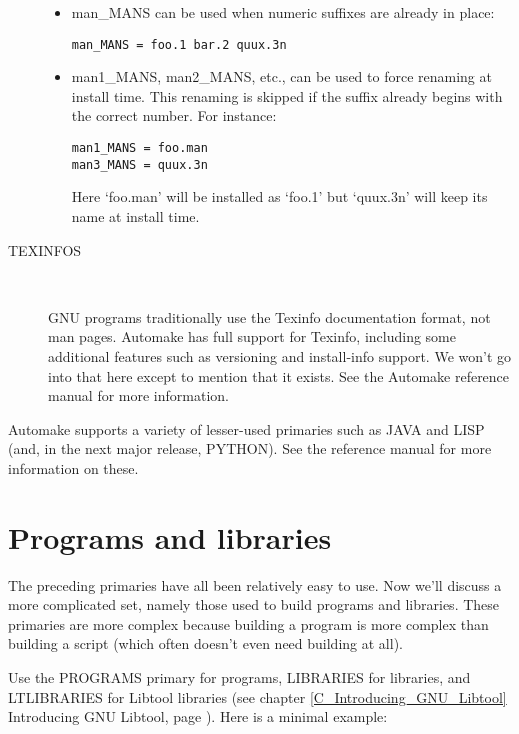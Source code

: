 \begin{description}
\begin{itemize}
\item man\_{}MANS can be used when numeric suffixes are already in place: 

\begin{Verbatim}[frame=single]
man_MANS = foo.1 bar.2 quux.3n
\end{Verbatim}

\item man1\_{}MANS, man2\_{}MANS, etc., can be used to force renaming at install time. This renaming is skipped if the suffix already begins with the correct number. For instance: 

\begin{Verbatim}[frame=single]
man1_MANS = foo.man
man3_MANS = quux.3n
\end{Verbatim}

Here `foo.man' will be installed as `foo.1' but `quux.3n' will keep its name at install time. 
\end{itemize}

\item[TEXINFOS]
\ %

GNU programs traditionally use the Texinfo documentation format, not man pages. Automake has full support for Texinfo, including some additional features such as versioning and install-info support. We won't go into that here except to mention that it exists. See the Automake reference manual for more information. 
\end{description} 

Automake supports a variety of lesser-used primaries such as JAVA and LISP (and, in the next major release, PYTHON). See the reference manual for more information on these. 

\section{Programs and libraries}


The preceding primaries have all been relatively easy to use. Now we'll discuss a more complicated set, namely those used to build programs and libraries. These primaries are more complex because building a program is more complex than building a script (which often doesn't even need building at all). 


Use the PROGRAMS primary for programs, LIBRARIES for libraries, and 
LTLIBRARIES for Libtool libraries
(see chapter \ref{C_Introducing_GNU_Libtool} Introducing GNU Libtool,
page \pageref{C_Introducing_GNU_Libtool}). Here is a minimal example: 

